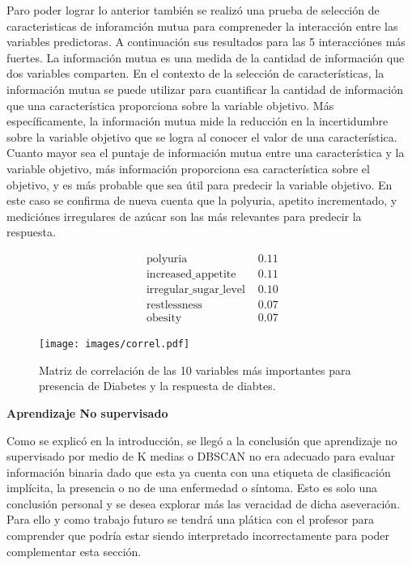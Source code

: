 \documentclass[twocolumn]{bmcart}%
\begin{document}
\begin{itemize}
Paro poder lograr lo anterior también se realizó una prueba de selección de caracteristicas de inforamción mutua para compreneder la interacción entre las variables predictoras. A continuación sus resultados para las 5 interacciónes más fuertes. La información mutua es una medida de la cantidad de información que dos variables comparten. En el contexto de la selección de características, la información mutua se puede utilizar para cuantificar la cantidad de información que una característica proporciona sobre la variable objetivo.
Más específicamente, la información mutua mide la reducción en la incertidumbre sobre la variable objetivo que se logra al conocer el valor de una característica. Cuanto mayor sea el puntaje de información mutua entre una característica y la variable objetivo, más información proporciona esa característica sobre el objetivo, y es más probable que sea útil para predecir la variable objetivo. En este caso se confirma de nueva cuenta que la polyuria, apetito incrementado, y mediciónes irregulares de azúcar son las más relevantes para predecir la respuesta. 

$$
\begin{array}{ll}
\text { polyuria } & 0.11 \\
\text { increased_appetite } & 0.11 \\
\text { irregular_sugar_level } & 0.10 \\
\text { restlessness } & 0.07 \\
\text { obesity } & 0.07
\end{array}
$$

\begin{figure}[h!]
  \caption{\csentence{}
     Matriz de correlación de las 10 variables más importantes para presencia de Diabetes y la respuesta de diabtes. }
\texttt{[image: images/correl.pdf]}  
      \end{figure}


\textbf{Aprendizaje No supervisado}

Como se explicó en la introducción, se llegó a la conclusión que aprendizaje no supervisado por medio de K medias o DBSCAN no era adecuado para evaluar información binaria dado que esta ya cuenta con una etiqueta de clasificación implícita, la presencia o no de una enfermedad o síntoma. Esto es solo una conclusión personal y se desea explorar más las veracidad de dicha aseveración. Para ello y como trabajo futuro se tendrá una plática con el profesor para comprender que podría estar siendo interpretado incorrectamente para poder complementar esta sección. 


\end{itemize}
\end{document}
